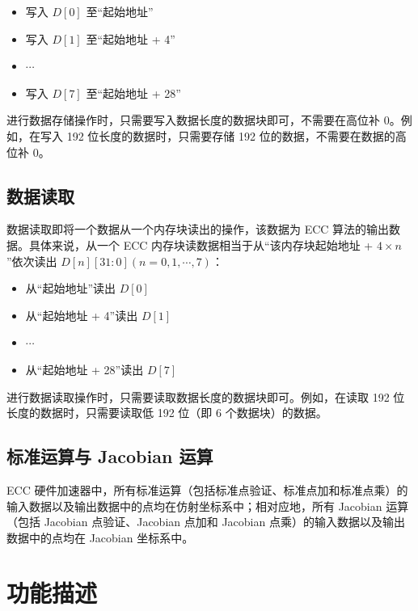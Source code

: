 \documentclass[main\_\_CN.tex]{subfiles}
\begin{document}
\begin{itemize}
    \item 写入 $D[0]$ 至“起始地址”
    \item 写入 $D[1]$ 至“起始地址 + 4”
    \item $\cdots$
    \item 写入 $D[7]$ 至“起始地址 + 28”
\end{itemize}

\begin{tiplisting}
进行数据存储操作时，只需要写入数据长度的数据块即可，不需要在高位补 0。例如，在写入 192 位长度的数据时，只需要存储 192 位的数据，不需要在数据的高位补 0。
\end{tiplisting}

\subsection{数据读取}

数据读取即将一个数据从一个内存块读出的操作，该数据为 ECC 算法的输出数据。具体来说，从一个 ECC 内存块读数据相当于从“该内存块起始地址 + $4 \times n$”依次读出 $D[n][31:0] (n=0, 1, \cdots, 7)$：
\begin{itemize}
    \item 从“起始地址”读出 $D[0]$
    \item 从“起始地址 + 4”读出 $D[1]$
    \item $\cdots$
    \item 从“起始地址 + 28”读出 $D[7]$
\end{itemize}

\begin{tiplisting}
进行数据读取操作时，只需要读取数据长度的数据块即可。例如，在读取 192 位长度的数据时，只需要读取低 192 位（即 6 个数据块）的数据。
\end{tiplisting}


\subsection{标准运算与 Jacobian 运算}

\chipname{} ECC 硬件加速器中，所有标准运算（包括标准点验证、标准点加和标准点乘）的输入数据以及输出数据中的点均在仿射坐标系中；相对应地，所有 Jacobian 运算（包括 Jacobian 点验证、Jacobian 点加和 Jacobian 点乘）的输入数据以及输出数据中的点均在 Jacobian 坐标系中。

\section{功能描述}
\label{sec:ecc-mode-config}
\end{document}
